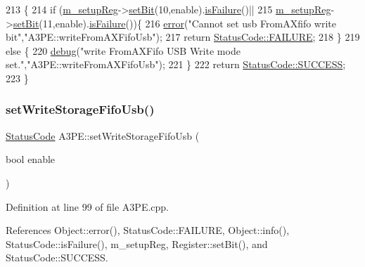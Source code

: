 \begin{DoxyCode}
213                                                 \{
214   \textcolor{keywordflow}{if} (\hyperlink{classA3PE_a142fa10b7e705c4701ae21678ec2ec8a}{m\_setupReg}->\hyperlink{classRegister_ab094246dd12aa7e0aa0ca917f4e70b31}{setBit}(10,enable).\hyperlink{classStatusCode_a5dd22dc6eb2c52fc4cabc58f6dea2eb7}{isFailure}()||
215       \hyperlink{classA3PE_a142fa10b7e705c4701ae21678ec2ec8a}{m\_setupReg}->\hyperlink{classRegister_ab094246dd12aa7e0aa0ca917f4e70b31}{setBit}(11,enable).\hyperlink{classStatusCode_a5dd22dc6eb2c52fc4cabc58f6dea2eb7}{isFailure}())\{
216     \hyperlink{classObject_a204a95f57818c0f811933917a30eff45}{error}(\textcolor{stringliteral}{"Cannot set usb FromAXfifo write bit"},\textcolor{stringliteral}{"A3PE::writeFromAXFifoUsb"});
217     \textcolor{keywordflow}{return} \hyperlink{classStatusCode_a6f565cbeadc76d14c72f047e5e85eb4ba3da73d4c469762eb9d3c960368252b26}{StatusCode::FAILURE};
218   \}
219   \textcolor{keywordflow}{else} \{
220     \hyperlink{classObject_aac010553f022165573714b7014a15f0d}{debug}(\textcolor{stringliteral}{"write FromAXFifo USB Write mode set."},\textcolor{stringliteral}{"A3PE::writeFromAXFifoUsb"});
221   \}
222   \textcolor{keywordflow}{return} \hyperlink{classStatusCode_a6f565cbeadc76d14c72f047e5e85eb4badd0da38d3ba0d922efd1f4619bc37ad8}{StatusCode::SUCCESS};
223 \}
\end{DoxyCode}
\mbox{\label{classA3PE_aa688f9dff8d2892464fcd13fdf3600ad}} 
\subsubsection{\texorpdfstring{set\+Write\+Storage\+Fifo\+Usb()}{setWriteStorageFifoUsb()}}
{\footnotesize\ttfamily \hyperlink{classStatusCode}{Status\+Code} A3\+P\+E\+::set\+Write\+Storage\+Fifo\+Usb (\begin{DoxyParamCaption}\item[{bool}]{enable }\end{DoxyParamCaption})}



Definition at line 99 of file A3\+P\+E.\+cpp.



References Object\+::error(), Status\+Code\+::\+F\+A\+I\+L\+U\+RE, Object\+::info(), Status\+Code\+::is\+Failure(), m\+\_\+setup\+Reg, Register\+::set\+Bit(), and Status\+Code\+::\+S\+U\+C\+C\+E\+SS.



